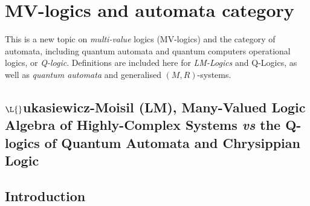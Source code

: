 \documentclass[12pt]{article}
\theoremstyle{plain}
\theoremstyle{definition}
\numberwithin{equation}{section}
\begin{document}
\section{MV-logics and automata category}
This is a new topic on \emph{multi-value} logics (MV-logics) and the category of automata, including quantum automata and quantum computers operational logics, or \emph{Q-logic}. Definitions are included here for \emph{LM-Logics} and 
Q-Logics, as well as \emph{quantum automata} and generalised $(M,R)$-systems.  

\subsection{$\L{}$ukasiewicz-Moisil (LM), Many-Valued Logic Algebra of 
Highly-Complex Systems \emph{vs} the Q-logics of Quantum Automata and Chrysippian Logic}

\subsection{Introduction}

\end{document}
